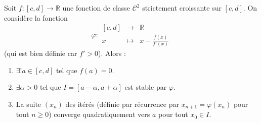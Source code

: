 





  \begin{theorem}
    Soit $f : [c, d] \rightarrow \mathbb{R}$ une fonction de classe $\mathcal{C}^2$ strictement croissante sur $[c, d]$. On considère la fonction
    \[ \varphi :
    \begin{array}{ccc}
      [c, d] &\rightarrow& \mathbb{R} \\
      x &\mapsto& x - \frac{f(x)}{f'(x)}
    \end{array}
    \]
    (qui est bien définie car $f' > 0$). Alors :
    \begin{enumerate}[label=(\roman*)]
      \item $\exists! a \in [c, d]$ tel que $f(a) = 0$.
      \item $\exists \alpha > 0$ tel que $I = [a - \alpha, a + \alpha]$ est stable par $\varphi$.
      \item La suite $(x_n)$ des itérés (définie par récurrence par $x_{n+1} = \varphi(x_n)$ pour tout $n \geq 0$) converge quadratiquement vers $a$ pour tout $x_0 \in I$.
    \end{enumerate}
  \end{theorem}

